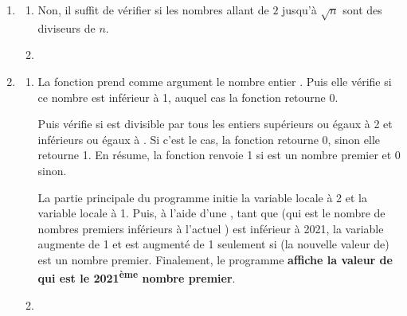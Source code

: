\begin{enumerate}[label=\thechapter.\arabic*., font=\bfseries, itemsep=10mm,labelsep*=3mm,left=0mm]
\item
\begin{enumerate}[label=\alph*),itemsep=3mm]
\item Non, il suffit de vérifier si les nombres allant de $2$ jusqu'à $\sqrt{n}$ sont des diviseurs de $n$.

\item \begin{minipage}[t][][b]{1\textwidth}
\vspace{-4mm}
\end{minipage}
\end{enumerate}



\item
\begin{enumerate}[label=\alph*),itemsep=3mm]
\item La fonction  prend comme argument le nombre entier . Puis elle vérifie si ce nombre est inférieur à 1, auquel cas la fonction retourne 0.

Puis  vérifie si  est divisible par tous les entiers supérieurs ou égaux à 2 et inférieurs ou égaux à . Si c'est le cas, la fonction retourne 0, sinon elle retourne 1. En résume, la fonction  renvoie 1 si  est un nombre premier et 0 sinon.

\smallskip
La partie principale du programme initie la variable locale  à 2 et la variable locale  à 1. Puis, à l'aide d'une , tant que  (qui est le nombre de nombres premiers inférieurs à l'actuel ) est inférieur à 2021, la variable  augmente de 1 et  est augmenté de 1 seulement si (la nouvelle valeur de)  est un nombre premier. Finalement, le programme \textbf{affiche la valeur de  qui est le 2021\textsuperscript{ème} nombre premier}.

\item \begin{minipage}[t][][b]{1\textwidth}
\end{minipage}
\end{enumerate}







\end{enumerate}





















